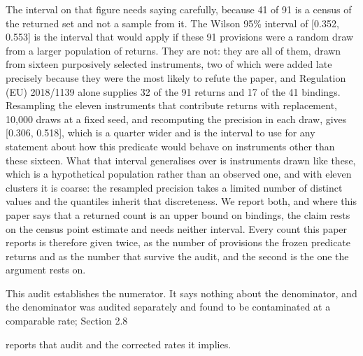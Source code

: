The interval on that figure needs saying carefully, because 41 of 91 is a census of the returned set and not a sample from it. The Wilson 95\% interval of [0.352, 0.553] is the interval that would apply if these 91 provisions were a random draw from a larger population of returns. They are not: they are all of them, drawn from sixteen purposively selected instruments, two of which were added late precisely because they were the most likely to refute the paper, and Regulation (EU) 2018/1139 alone supplies 32 of the 91 returns and 17 of the 41 bindings. Resampling the eleven instruments that contribute returns with replacement, 10,000 draws at a fixed seed, and recomputing the precision in each draw, gives [0.306, 0.518], which is a quarter wider and is the interval to use for any statement about how this predicate would behave on instruments other than these sixteen. What that interval generalises over is instruments drawn like these, which is a hypothetical population rather than an observed one, and with eleven clusters it is coarse: the resampled precision takes a limited number of distinct values and the quantiles inherit that discreteness. We report both, and where this paper says that a returned count is an upper bound on bindings, the claim rests on the census point estimate and needs neither interval. Every count this paper reports is therefore given twice, as the number of provisions the frozen predicate returns and as the number that survive the audit, and the second is the one the argument rests on.

This audit establishes the numerator. It says nothing about the denominator, and the denominator was audited separately and found to be contaminated at a comparable rate; Section 2.8

reports that audit and the corrected rates it implies.

